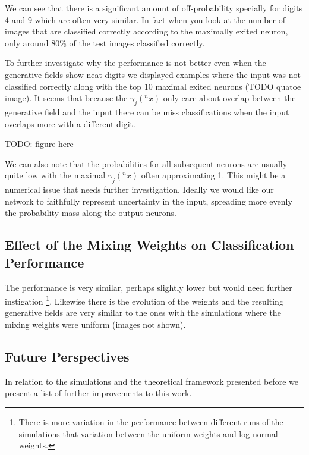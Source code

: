 \documentclass{article}
\begin{document}
We can see that there is a significant amount of off-probability specially for digits 4 and 9 which are often very similar. In fact when you look at the number of images that are classified correctly according to the maximally exited neuron, only around 80\% of the test images classified correctly. 

To further investigate why the performance is not better even when the generative fields show neat digits we displayed examples where the input was not classified correctly along with the top 10 maximal exited neurons (TODO quatoe image). It seems that because the \(\gamma_j(^nx)\) only care about overlap between the generative field and the input there can be miss classifications when the input overlaps more with a different digit. 

TODO: figure here

We can also note that the probabilities for all subsequent neurons are usually quite low with the maximal \(\gamma_j(^nx)\) often approximating 1. This might be a numerical issue that needs further investigation. Ideally we would like our network to faithfully represent uncertainty in the input, spreading more evenly the probability mass along the output neurons. 

\subsection{Effect of the Mixing Weights on Classification Performance}
The performance is very similar, perhaps slightly lower but would need further instigation \footnote{There is more variation in the performance between different runs of the simulations that variation between the uniform weights and log normal weights.}. Likewise there is the evolution of the weights and the resulting generative fields are very similar to the ones with the simulations where the mixing weights were uniform (images not shown).

\subsection{Future Perspectives}
In relation to the simulations and the theoretical framework presented before we present a list of further improvements to this work.
\end{document}
